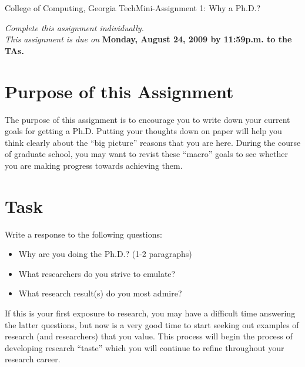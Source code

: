\documentclass[11pt]{article}
\begin{document}


{College of Computing, Georgia Tech}{Mini-Assignment 1: Why a Ph.D.?}

{\em Complete this assignment individually. \\  This
  assignment is due on} {\bf Monday, August 24, 2009 by 11:59p.m. to
  the TAs.}

\section{Purpose of this Assignment}

The purpose of this assignment is to encourage you to write down your
current goals for getting a Ph.D.  Putting your thoughts down on paper
will help you think clearly about the ``big picture'' reasons that you
are here.  During the course of graduate school, you may want to revist
these ``macro'' goals to see whether you are making progress towards
achieving them.

\section{Task}

Write a response to the following questions:
\begin{itemize}
\itemsep=-1pt
    \item Why are you doing the Ph.D.? (1-2 paragraphs)
    \item What researchers do you strive to emulate?
    \item What research result(s) do you most admire?
\end{itemize}
\noindent
If this is your first exposure to research, you may have a difficult
time answering the latter questions, but now is a very good time to
start seeking out examples of research (and researchers) that you
value.  This process will begin the process of developing
research ``taste'' which you will continue to refine throughout your
research career.
\end{document}
